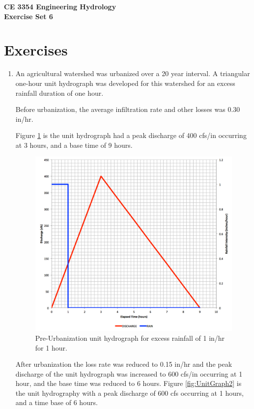 \documentclass[12pt]{article}
\begin{document}
\begin{center}
{\textbf{{ CE 3354 Engineering Hydrology} \\ {Exercise Set 6}}}
\end{center}

 \section*{\small{Exercises}}
 \begin{enumerate}

\item An agricultural watershed was urbanized over a 20 year interval.  A triangular one-hour unit hydrograph was developed for this watershed for an excess rainfall duration of one hour.  

Before urbanization, the average infiltration rate and other losses was 0.30 in/hr.  

Figure \ref{fig:UnitGraph1} is the unit hydrograph had  a peak discharge of 400 cfs/in occurring at 3 hours, and a base time of 9 hours.
\begin{figure}[h!] %
   \centering
   \includegraphics[width=5in]{UnitGraph1.jpg} 
   \caption{Pre-Urbanization unit hydrograph for excess rainfall of 1 in/hr for 1 hour.}
   \label{fig:UnitGraph1}
\end{figure}
\clearpage

After urbanization the loss rate was reduced to 0.15 in/hr and the peak discharge of the unit hydrograph was increased to 600 cfs/in occurring at 1 hour, and the base time was reduced to 6 hours.    Figure \ref{fig:UnitGraph2} is the unit hydrography with a peak discharge of 600 cfs occurring at 1 hours, and a time base of 6 hours.


\end{enumerate}
\end{document}

